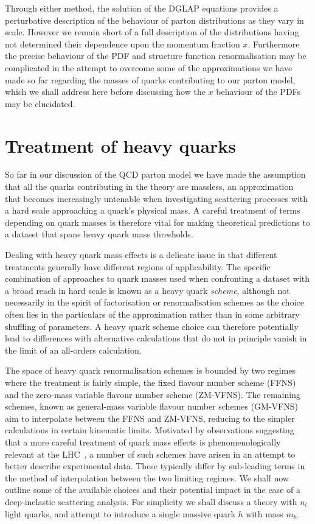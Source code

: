 Through either method, the solution of the DGLAP equations provides a perturbative description of the behaviour of parton distributions as they vary in scale. However we remain short of a full description of the distributions having not determined their dependence upon the momentum fraction $x$. Furthermore the precise behaviour of the PDF and structure function renormalisation may be complicated in the attempt to overcome some of the approximations we have made so far regarding the masses of quarks contributing to our parton model, which we shall address here before discussing how the $x$ behaviour of the PDFs may be elucidated.

\section{Treatment of heavy quarks}
So far in our discussion of the QCD parton model we have made the assumption that all the quarks contributing in the theory are massless, an approximation that becomes increasingly untenable when investigating scattering processes with a hard scale approaching a quark's physical mass. A careful treatment of terms depending on quark masses is therefore vital for making theoretical predictions to a dataset that spans heavy quark mass thresholds. 

Dealing with heavy quark mass effects is a delicate issue in that different treatments generally have different regions of applicability. The specific combination of approaches to quark masses used when confronting a dataset with a broad reach in hard scale is known as a heavy quark \emph{scheme}, although not necessarily in the spirit of factorisation or renormalisation schemes as the choice often lies in the particulars of the approximation rather than in some arbitrary shuffling of parameters. A heavy quark scheme choice can therefore potentially lead to differences with alternative calculations that do not in principle vanish in the limit of an all-orders calculation.

The space of heavy quark renormalisation schemes is bounded by two regimes where the treatment is fairly simple, the fixed flavour number scheme (FFNS) and the zero-mass variable flavour number scheme (ZM-VFNS). The remaining schemes, known as general-mass variable flavour number schemes (GM-VFNS) aim to interpolate between the FFNS and ZM-VFNS, reducing to the simpler calculations in certain kinematic limits. Motivated by observations suggesting that a more careful treatment of quark mass effects is phenomenologically relevant at the LHC~\cite{Tung:2006tb}, a number of such schemes have arisen in an attempt to better describe experimental data. These typically differ by sub-leading terms in the method of interpolation between the two limiting regimes. We shall now outline some of the available choices and their potential impact in the case of a deep-inelastic scattering analysis. For simplicity we shall discuss a theory with $n_l$ light quarks, and attempt to introduce a single massive quark $h$ with mass $m_h$.


